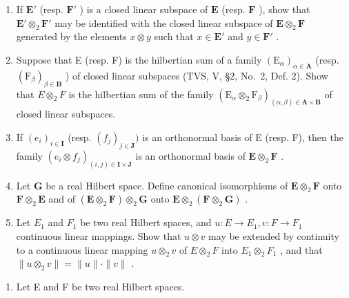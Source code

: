 \begin{enumerate}
\def\labelenumi{\alph{enumi})}
\item
  If \(\mathbf{E}'\) (resp. \(\mathbf{F}'\) ) is a closed linear subspace of \(\mathbf{E}\) (resp. \(\mathbf{F}\) ), show that \(\mathbf{E}' \otimes_2 \mathbf{F}'\) may be identified with the closed linear subspace of \(\mathbf{E} \otimes_2 \mathbf{F}\) generated by the elements \(x \otimes y\) such that \(x \in \mathbf{E}'\) and \(y \in \mathbf{F}'\) .
\item
  Suppose that E (resp. F) is the hilbertian sum of a family \((\mathrm{E}_{\alpha})_{\alpha\in\mathbf{A}}\) (resp. \((\mathrm{F}_{\beta})_{\beta\in\mathbf{B}}\) ) of closed linear subspaces (TVS, V, §2, No.~2, Def. 2). Show that \(E\otimes_{2}F\) is the hilbertian sum of the family \((\mathrm{E}_{\alpha}\otimes_{2}\mathrm{F}_{\beta})_{(\alpha,\beta)\in\mathbf{A}\times\mathbf{B}}\) of closed linear subspaces.
\item
  If \((e_i)_{i\in \mathbf{I}}\) (resp. \((f_j)_{j\in \mathbf{J}})\) is an orthonormal basis of E (resp. F), then the family \((e_i\otimes f_j)_{(i,j)\in \mathbf{I}\times \mathbf{J}}\) is an orthonormal basis of \(\mathbf{E}\otimes_2\mathbf{F}\) .
\item
  Let \(\mathbf{G}\) be a real Hilbert space. Define canonical isomorphisms of \(\mathbf{E} \otimes_{2} \mathbf{F}\) onto \(\mathbf{F} \otimes_{2} \mathbf{E}\) and of \((\mathbf{E} \otimes_{2} \mathbf{F}) \otimes_{2} \mathbf{G}\) onto \(\mathbf{E} \otimes_{2} (\mathbf{F} \otimes_{2} \mathbf{G})\) .
\item
  Let \(E_{1}\) and \(F_{1}\) be two real Hilbert spaces, and \(u:E\to E_{1}, v:F\to F_{1}\) continuous linear mappings. Show that \(u\otimes v\) may be extended by continuity to a continuous linear mapping \(u\otimes_{2}v\) of \(E\otimes_{2}F\) into \(E_{1}\otimes_{2}F_{1}\) , and that \(\|u\otimes_{2}v\|=\|u\|\cdot\|v\|\) .
\end{enumerate}

\begin{enumerate}
\def\labelenumi{\arabic{enumi})}
\setcounter{enumi}{8}
\tightlist
\item
  Let E and F be two real Hilbert spaces.
\end{enumerate}


